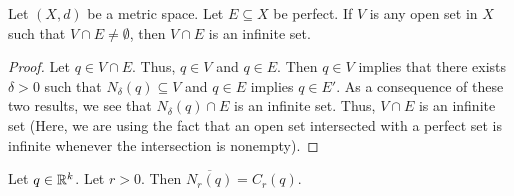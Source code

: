 \documentclass[a4paper]{report}
\begin{document}
\begin{lemma}
   Let \( (X,d) \) be a metric space. Let \( E \subseteq  X  \) be perfect. If \( V \) is any open set in \( X  \) such that \( V \cap E \neq \emptyset \), then \( V \cap E  \) is an infinite set.  
\end{lemma}
\begin{proof}
Let \( q \in V \cap E  \). Thus, \( q \in V  \) and \( q \in E  \). Then \( q \in V  \) implies that there exists \( \delta > 0  \) such that \( {N}_{\delta}(q) \subseteq  V   \) and \( q \in E  \) implies \( q \in E' \). As a consequence of these two results, we see that \( {N}_{\delta}(q) \cap E  \) is an infinite set. Thus, \( V \cap E  \) is an infinite set (Here, we are using the fact that an open set intersected with a perfect set is infinite whenever the intersection is nonempty). 
\end{proof}
\begin{lemma}
    Let \( q \in \mathbb{R}^{k} \). Let \( r > 0  \). Then \(  \overline{{N}_{r}(q)} = {C}_{r}(q). \)
\end{lemma}
\end{document}
